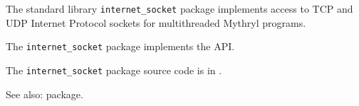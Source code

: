 
The standard library {\tt internet\_socket} package implements access to TCP and UDP Internet Protocol sockets for multithreaded Mythryl programs.

The {\tt internet\_socket} package implements the  API.

The {\tt internet\_socket} package source code is in .

See also:   package.

